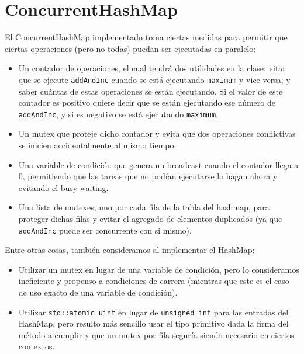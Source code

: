 \section{ConcurrentHashMap}

El ConcurrentHashMap implementado toma ciertas medidas para permitir que ciertas operaciones (pero no todas) puedan ser ejecutadas en paralelo:

\begin{itemize}

	\item Un contador de operaciones, el cual tendrá dos utilidades en la clase: vitar que se ejecute \texttt{addAndInc} cuando se está ejecutando \texttt{maximum} y vice-versa; y saber cuántas de estas operaciones se están ejecutando. Si el valor de este contador es positivo quiere decir que se están ejecutando ese número de \texttt{addAndInc}, y si es negativo se está ejecutando \texttt{maximum}.

	\item Un mutex que proteje dicho contador y evita que dos operaciones conflictivas se inicien accidentalmente al mismo tiempo.

	\item Una variable de condición que genera un broadcast cuando el contador llega a 0, permitiendo que las tareas que no podían ejecutarse lo hagan ahora y evitando el busy waiting.

	\item Una lista de mutexes, uno por cada fila de la tabla del hashmap, para proteger dichas filas y evitar el agregado de elementos duplicados (ya que \texttt{addAndInc} puede ser concurrente con si mismo).

\end{itemize}

Entre otras cosas, también consideramos al implementar el HashMap:

\begin{itemize}

	\item Utilizar un mutex en lugar de una variable de condición, pero lo consideramos ineficiente y propenso a condiciones de carrera (mientras que este es el caso de uso exacto de una variable de condición).

	\item Utilizar \texttt{std::atomic\_uint} en lugar de \texttt{unsigned int} para las entradas del HashMap, pero resulto más sencillo usar el tipo primitivo dada la firma del método a cumplir y que un mutex por fila seguría siendo necesario en ciertos contextos.

\end{itemize}

